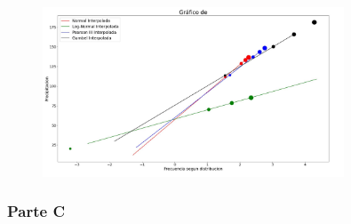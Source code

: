 \documentclass{article}  %
\begin{document}
\begin{figure}[H]
  \centering
  \includegraphics[width=0.8\textwidth]{grafico_b_proyecciones.jpg}
  \caption{}
  \label{fig:grafico_b_preyecciones}
\end{figure}

\subsubsection*{Parte C}
\end{document}
